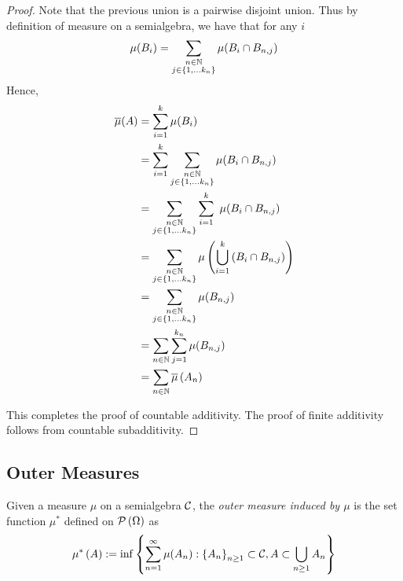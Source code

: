 \begin{proof}
    Note that the previous union is a pairwise disjoint union. Thus by definition of measure on a semialgebra, we have that for any $i$
    \begin{equation*}
	\mu (B_i) =\sum_{\substack{n\in \mathbb N \\ j\in \left\{ 1, \ldots k_n \right\}}} \mu (B_i \cap B_{n,j}) 
    \end{equation*}
    Hence, 
    \begin{align*}
	\overline \mu (A) &= \sum_{i=1}^{k} \mu (B_i ) \\
	&= \sum_{i=1}^{k} \sum_{\substack{n\in \mathbb N \\ j\in \left\{ 1, \ldots k_n \right\}}} \mu (B_i \cap B_{n,j}) \\
&= \sum_{\substack{n\in \mathbb N \\ j\in \left\{ 1, \ldots k_n \right\}}}\sum_{i=1}^{k} \ \mu (B_i \cap B_{n,j}) \\
&= \sum_{\substack{n\in \mathbb N \\ j\in \left\{ 1, \ldots k_n \right\}}} \mu \left( \bigcup_{i=1}^k \left( B_i \cap B_{n,j} \right) \right) \\
&= \sum_{\substack{n\in \mathbb N \\ j\in \left\{ 1, \ldots k_n \right\}}} \mu (B_{n,j}) \\
&= \sum_{n\in \mathbb N} \sum_{j=1}^{k_n} \mu (B_{n,j}) \\
&= \sum_{n\in \mathbb N} \overline \mu \left( A_n \right)
    \end{align*}
    
This completes the proof of countable additivity. The proof of finite additivity follows from countable subadditivity.
\end{proof}

\subsection{Outer Measures}

\begin{definition}
    Given a measure $\mu$ on a semialgebra ${\cal C}$, the \textit{outer measure induced by $\mu$} is the set function $\mu ^{*}$ defined on ${\cal P} \left( \Omega \right)$ as
    \begin{equation*}
	\mu ^{*} \left( A \right) := \inf \left\{ \sum_{n=1}^{\infty} \mu (A_n) : \left\{ A_n \right\} _{n\ge 1} \subset {\cal C} , A \subset \bigcup_{n \ge 1} A_n \right\}
	\label{eqn:outer-measure}
    \end{equation*}
    \label{def:outer-measure}
\end{definition}


